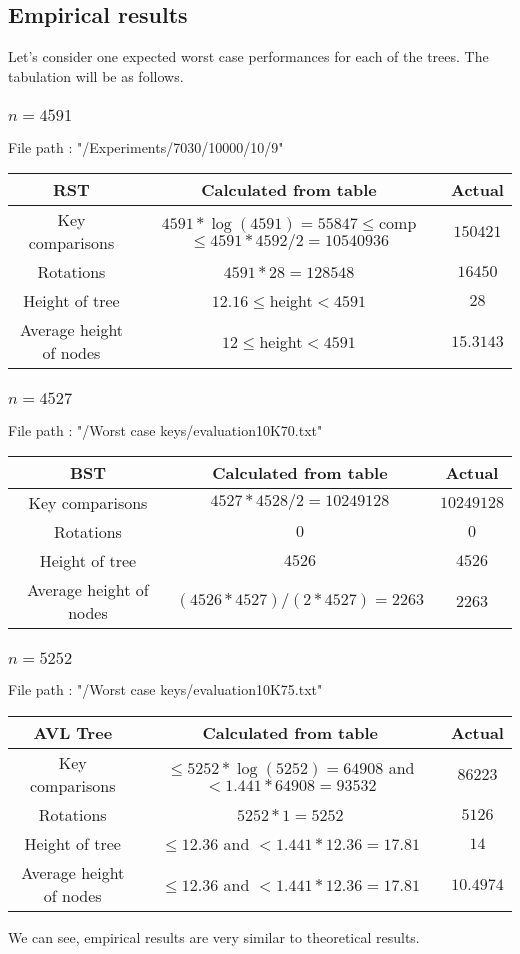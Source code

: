 \documentclass{article}
\begin{document}
\subsection{Empirical results}
Let's consider one expected worst case performances for each of the trees. The tabulation will be as follows.
\subsubsection{$n=4591$}
File path : "/Experiments/7030/10000/10/9"
\begin{center}
\begin{tabular}{||c || c | c||} 
\hline
RST & Calculated from table & Actual \\
\hline\hline
Key comparisons & $4591*\log(4591)=55847\le$comp$\le 4591*4592/2=10540936$ & $150421$ \\
\hline
Rotations & $4591*28=128548$ & $16450$ \\
\hline
Height of tree & $12.16\le$height$<4591$ & $28$ \\
\hline
Average height of nodes & $12\le$height$<4591$ & $15.3143$ \\
\hline
\end{tabular}
\end{center}
\subsubsection{$n=4527$}
File path : "/Worst case keys/evaluation10K70.txt"
\begin{center}
\begin{tabular}{||c || c | c||} 
\hline
BST & Calculated from table & Actual \\
\hline\hline
Key comparisons & $4527*4528/2=10249128$ & $10249128$ \\ 
\hline
Rotations & $0$ & $0$ \\
\hline
Height of tree & $4526$ & $4526$ \\
\hline
Average height of nodes & $(4526*4527)/(2*4527)=2263$ & $2263$ \\
\hline
\end{tabular}
\end{center}
\subsubsection{$n=5252$}
File path : "/Worst case keys/evaluation10K75.txt"
\begin{center}
\begin{tabular}{||c || c | c||} 
\hline
AVL Tree & Calculated from table & Actual \\
\hline\hline
Key comparisons & $\le 5252*\log(5252)=64908$ and $<1.441*64908=93532$ & $86223$ \\ 
\hline
Rotations & $5252*1=5252$ & $5126$ \\
\hline
Height of tree & $\le 12.36$ and $<1.441*12.36=17.81$ & $14$ \\
\hline
Average height of nodes & $\le 12.36$ and $<1.441*12.36=17.81$ & $10.4974$ \\
\hline
\end{tabular}
\end{center}
We can see, empirical results are very similar to theoretical results.
\end{document}
